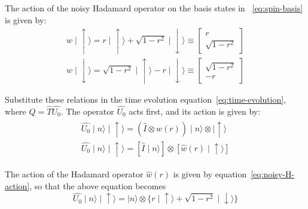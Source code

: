 \documentclass[english]{article}
\begin{document}
The action of the noisy Hadamard operator on the basis states in ~\eqref{eq:spin-basis} is given by:
\begin{subequations} \label{eq:noisy-H-action}
\begin{align}
\hat{w} \mid\! \uparrow\rangle =  r\mid\!\uparrow\rangle + \sqrt{1 - r^{2}} \mid\!\downarrow\rangle   \equiv \left[ \begin{array}{c}
                                            r  \\
                                         \sqrt{1 - r^{2}}
                                        \end{array} \right]        \\                                                                  
\hat{w} \mid\! \downarrow\rangle =  \sqrt{1 - r^{2}} \mid\!\uparrow\rangle - r \mid\!\downarrow\rangle  \equiv   \left[ \begin{array}{c}
                                         \sqrt{1 - r^{2}}  \\
                                               -r
                                        \end{array} \right] 
\end{align}                                                                               
\end{subequations}

Substitute these relations in the time evolution equation~\eqref{eq:time-evolution}, where $Q = \hat{T}\hat{U_{0}}$. The operator $\hat{U_{0}}$ acts first, and its action is given by:
\begin{eqnarray}
\begin{aligned}
\hat{U_{0}}\mid\! n\rangle \mid\!\uparrow\rangle = (\hat{I}\otimes \hat{w}(r)) \mid\! n\rangle \otimes \mid\!\uparrow\rangle \\
\hat{U_{0}}\mid\! n\rangle \mid\!\uparrow\rangle = [\hat{I}\mid\! n\rangle] \otimes [\hat{w}(r)\mid\!\uparrow\rangle]
\end{aligned}
\end{eqnarray} 

The action of the Hadamard operator $\hat{w}(r)$ is given by equation~\eqref{eq:noisy-H-action}, so that the above equation becomes
\begin{equation}
\hat{U_{0}}\mid\! n\rangle \mid\!\uparrow\rangle = \mid\! n\rangle \otimes \{r\mid\!\uparrow\rangle + \sqrt{1 - r^{2}} \mid\! \downarrow\rangle\}
\end{equation}
\end{document}

